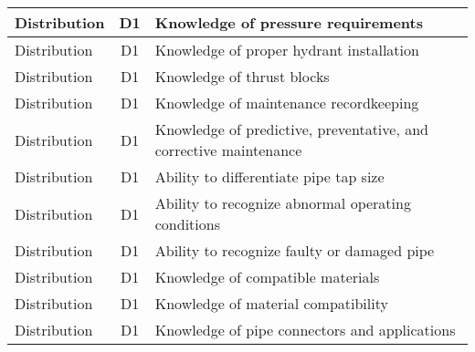 \documentclass{article}
\begin{document}
\begin{table}[]
\begin{tabular}{|l|c|l|}
Distribution                           & D1             & Knowledge of pressure   requirements                                                                                              \\ \hline
Distribution                           & D1             & Knowledge of proper   hydrant installation                                                                                        \\ \hline
Distribution                           & D1             & Knowledge of thrust   blocks                                                                                                      \\ \hline
Distribution                           & D1             & Knowledge of   maintenance recordkeeping                                                                                          \\ \hline
Distribution                           & D1             & Knowledge of   predictive, preventative, and corrective maintenance                                                               \\ \hline
Distribution                           & D1             & Ability to   differentiate pipe tap size                                                                                          \\ \hline
Distribution                           & D1             & Ability to recognize   abnormal operating conditions                                                                              \\ \hline
Distribution                           & D1             & Ability to recognize   faulty or damaged pipe                                                                                     \\ \hline
Distribution                           & D1             & Knowledge of   compatible materials                                                                                               \\ \hline
Distribution                           & D1             & Knowledge of material   compatibility                                                                                             \\ \hline
Distribution                           & D1             & Knowledge of pipe   connectors and applications                                                                                   \\ \hline

\end{tabular}
\end{table}
\end{document}
